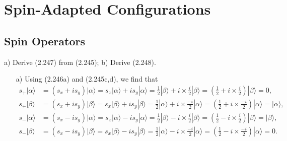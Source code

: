 \documentclass[a4paper]{book}
\newcounter{exercise}[chapter]
\newcounter{solution}[chapter]
\begin{document}
	\section{Spin-Adapted Configurations}
	
	\subsection{Spin Operators}
	
	\begin{exercise}
	a) Derive (2.247) from (2.245); b) Derive (2.248).
	\end{exercise}
	
	\begin{solution}
	
	\begin{itemize}
	
	\item[a)] Using (2.246a) and (2.245c,d), we find that
	\begin{align*}
		s_+ | \alpha \rangle &= ( s_x + i s_y ) | \alpha \rangle = s_x | \alpha \rangle + i s_y | \alpha \rangle = \frac{1}{2} | \beta \rangle + i \times \frac{ i }{ 2 } | \beta \rangle = \left( \frac{1}{2} + i \times \frac{ i }{ 2 } \right) | \beta \rangle = 0 , \\
		s_+ | \beta \rangle &= ( s_x + i s_y ) | \beta \rangle = s_x | \beta \rangle + i s_y | \beta \rangle = \frac{1}{2} | \alpha \rangle + i \times \frac{ -i }{ 2 } | \alpha \rangle = \left( \frac{1}{2} + i \times \frac{ -i }{ 2 } \right) | \alpha \rangle = | \alpha \rangle , \\
		s_- | \alpha \rangle &= ( s_x - i s_y ) | \alpha \rangle = s_x | \alpha \rangle - i s_y | \alpha \rangle = \frac{1}{2} | \beta \rangle - i \times \frac{ i }{ 2 } | \beta \rangle = \left( \frac{1}{2} - i \times \frac{ i }{ 2 } \right) | \beta \rangle = | \beta \rangle , \\
		s_- | \beta \rangle &= ( s_x - i s_y ) | \beta \rangle = s_x | \beta \rangle - i s_y | \beta \rangle = \frac{1}{2} | \alpha \rangle - i \times \frac{ -i }{ 2 } | \alpha \rangle = \left( \frac{1}{2} - i \times \frac{ -i }{ 2 } \right) | \alpha \rangle = 0 .
	\end{align*}
	

\end{itemize}
\end{solution}
\end{document}
